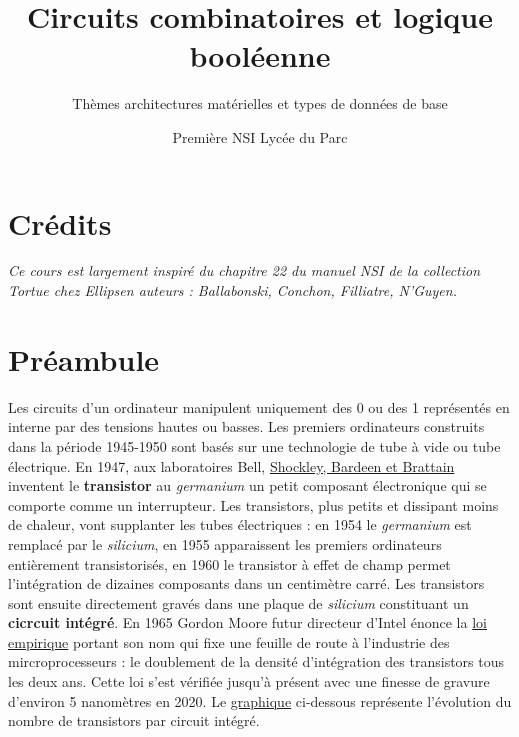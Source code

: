 \documentclass[
  11pt,
]{article}
\title{Circuits combinatoires et logique booléenne}
\subtitle{Thèmes architectures matérielles et types de données de base}
\author{Première NSI Lycée du Parc}
\date{}
\newcounter{cours}
\newcounter{logi}
\begin{document}
\maketitle

\renewcommand*\contentsname{Table des matières}
{
\hypersetup{linkcolor=}
\setcounter{tocdepth}{3}
\tableofcontents
}
\hypertarget{cruxe9dits}{%
\section*{Crédits}\label{cruxe9dits}}

\emph{Ce cours est largement inspiré du chapitre 22 du manuel NSI de la
collection Tortue chez Ellipsen auteurs : Ballabonski, Conchon,
Filliatre, N'Guyen.}

\hypertarget{pruxe9ambule}{%
\section*{Préambule}\label{pruxe9ambule}}

Les circuits d'un ordinateur manipulent uniquement des 0 ou des 1
représentés en interne par des tensions hautes ou basses. Les premiers
ordinateurs construits dans la période 1945-1950 sont basés sur une
technologie de tube à vide ou tube électrique. En 1947, aux laboratoires
Bell, \href{https://fr.wikipedia.org/wiki/Transistor}{Shockley, Bardeen
et Brattain} inventent le \textbf{transistor} au \emph{germanium} un
petit composant électronique qui se comporte comme un interrupteur. Les
transistors, plus petits et dissipant moins de chaleur, vont supplanter
les tubes électriques : en 1954 le \emph{germanium} est remplacé par le
\emph{silicium}, en 1955 apparaissent les premiers ordinateurs
entièrement transistorisés, en 1960 le transistor à effet de champ
permet l'intégration de dizaines composants dans un centimètre carré.
Les transistors sont ensuite directement gravés dans une plaque de
\emph{silicium} constituant un \textbf{cicrcuit intégré}. En 1965 Gordon
Moore futur directeur d'Intel énonce la
\href{https://fr.wikipedia.org/wiki/Loi_de_Moore}{loi empirique} portant
son nom qui fixe une feuille de route à l'industrie des
mircroprocesseurs : le doublement de la densité d'intégration des
transistors tous les deux ans. Cette loi s'est vérifiée jusqu'à présent
avec une finesse de gravure d'environ 5 nanomètres en 2020. Le
\href{https://en.wikipedia.org/wiki/Moore\%27s_law\#/media/File:Moore's_Law_Transistor_Count_1971-2018.png}{graphique}
ci-dessous représente l'évolution du nombre de transistors par circuit
intégré.
\end{document}
